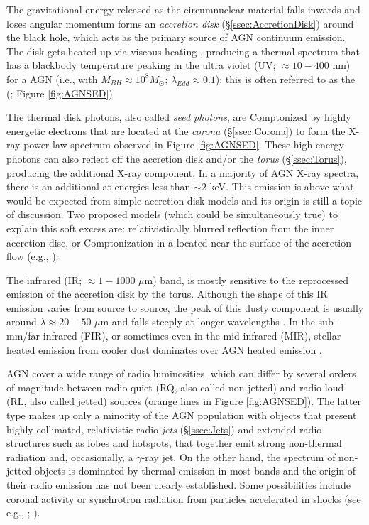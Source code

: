The gravitational energy released as the circumnuclear material falls inwards and loses angular momentum forms an \textit{accretion disk} (\S \ref{ssec:AccretionDisk}) around the black hole, which acts as the primary source of AGN continuum emission. The disk gets heated up via viscous heating \parencite{Peterson1993RM}, producing a thermal spectrum that has a blackbody temperature peaking in the ultra violet (UV; $\approx 10-400$ nm) for a  AGN (i.e., with $M_{BH} \approx 10^8 M_{\odot}$; $\lambda_{Edd} \approx0.1$); this is often referred to as the  (\cite{Harrison2014PhDThesis}; Figure \ref{fig:AGNSED})

The thermal disk photons, also called \textit{seed photons}, are Comptonized by highly energetic electrons that are located at the \textit{corona} (\S \ref{ssec:Corona}) to form the X-ray power-law spectrum observed in Figure \ref{fig:AGNSED}. These high energy photons can also reflect off the accretion disk and/or the \textit{torus} (\S \ref{ssec:Torus}), producing the additional  X-ray component. In a majority of AGN X-ray spectra, there is an additional  at energies less than $\sim 2$ keV. This emission is above what would be expected from simple accretion disk models and its origin is still a topic of discussion. Two proposed models (which could be simultaneously true) to explain this soft excess are: relativistically blurred reflection from the inner accretion disc, or Comptonization in a  located near the surface of the accretion flow (e.g., \cite{Ballantyne2022SoftExcess}).  

The infrared (IR; $\approx 1-1000$ $\mu$m) band, is mostly sensitive to the reprocessed emission of the accretion disk by the torus. Although the shape of this IR emission varies from source to source, the peak of this dusty component is usually around $\lambda \approx 20-50$ $\mu$m and falls steeply at longer wavelengths \parencite{Harrison2014PhDThesis}. In the sub-mm/far-infrared (FIR), or sometimes even in the mid-infrared (MIR), stellar heated emission from cooler dust dominates over AGN heated emission \parencite{Lutz2014SFRDust}. 

AGN cover a wide range of radio luminosities, which can differ by several orders of magnitude between radio-quiet (RQ, also called non-jetted) and radio-loud (RL, also called jetted) sources (orange lines in Figure \ref{fig:AGNSED}). The latter type makes up only a minority of the AGN population \parencite{Padovani2011Non-JettedAGNPop} with objects that present highly collimated, relativistic radio \textit{jets} (\S \ref{ssec:Jets}) and extended radio structures such as lobes and hotspots, that together emit strong non-thermal radiation and, occasionally, a $\gamma$-ray jet. On the other hand, the spectrum of non-jetted objects is dominated by thermal emission in most bands and the origin of their radio emission has not been clearly established. Some possibilities include coronal activity or synchrotron radiation from particles accelerated in shocks (see e.g., \cite{Laor2008RQEmission}; \cite{Ishibashi2011RadioQuietAGN}).

